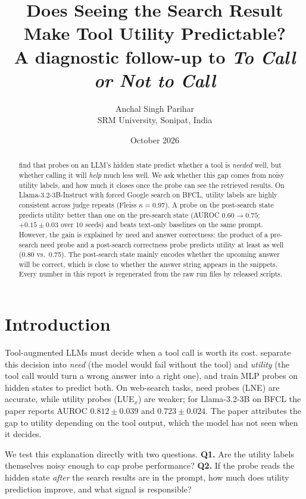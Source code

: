 \documentclass[10pt,twocolumn,a4paper]{article}
\title{\vspace{-1.2em}\textbf{Does Seeing the Search Result Make Tool Utility Predictable?}\\[2pt]
\large A diagnostic follow-up to \textit{To Call or Not to Call}}
\author{Anchal Singh Parihar\\ \small SRM University, Sonipat, India}
\date{\small October 2026}
\newcommand{\LUE}{LUE$_x$}
\begin{document}
\maketitle

\begin{abstract}
\citet{wu2026tocall} find that probes on an LLM's hidden state predict whether a tool is \emph{needed} well, but whether calling it will \emph{help} much less well. We ask whether this gap comes from noisy utility labels, and how much it closes once the probe can see the retrieved results. On Llama-3.2-3B-Instruct with forced Google search on BFCL, utility labels are highly consistent across judge repeats (Fleiss $\kappa = 0.97$). A probe on the post-search state predicts utility better than one on the pre-search state (AUROC $0.60 \rightarrow 0.75$; $+0.15 \pm 0.03$ over 10 seeds) and beats text-only baselines on the same prompt. However, the gain is explained by need and answer correctness: the product of a pre-search need probe and a post-search correctness probe predicts utility at least as well (0.80 vs.\ 0.75). The post-search state mainly encodes whether the upcoming answer will be correct, which is close to whether the answer string appears in the snippets. Every number in this report is regenerated from the raw run files by released scripts.
\end{abstract}

\section{Introduction}
Tool-augmented LLMs must decide when a tool call is worth its cost. \citet{wu2026tocall} separate this decision into \emph{need} (the model would fail without the tool) and \emph{utility} (the tool call would turn a wrong answer into a right one), and train MLP probes on hidden states to predict both. On web-search tasks, need probes (LNE) are accurate, while utility probes (\LUE) are weaker; for Llama-3.2-3B on BFCL the paper reports AUROC $0.812 \pm 0.039$ and $0.723 \pm 0.024$. The paper attributes the gap to utility depending on the tool output, which the model has not seen when it decides.

We test this explanation directly with two questions.
\textbf{Q1.} Are the utility labels themselves noisy enough to cap probe performance?
\textbf{Q2.} If the probe reads the hidden state \emph{after} the search results are in the prompt, how much does utility prediction improve, and what signal is responsible?
\end{document}
